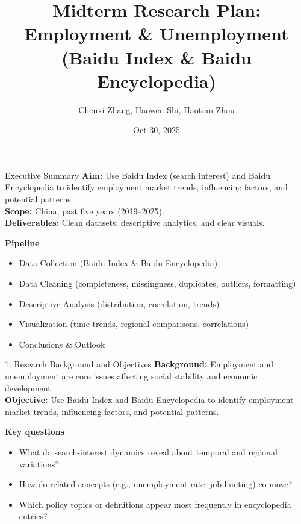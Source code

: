 \documentclass[aspectratio=169,11pt]{beamer}
\title[Employment \& Unemployment (Baidu Index \& Baike)]%
{Midterm Research Plan: Employment \& Unemployment (Baidu Index \& Baidu Encyclopedia)}
\author{Chenxi Zhang, Haowen Shi, Haotian Zhou} %
\institute{Course: Data Science and AI}
\date[Oct 30, 2025]{Oct 30, 2025}
\begin{document}
	
	\begin{frame}
		\titlepage
	\end{frame}
	
	\begin{frame}{Executive Summary}
		\small
		\textbf{Aim:} Use Baidu Index (search interest) and Baidu Encyclopedia to identify employment market trends, influencing factors, and potential patterns. \\
		\textbf{Scope:} China, past five years (2019--2025). \\
		\textbf{Deliverables:} Clean datasets, descriptive analytics, and clear visuals.
		\medskip
		
		\textbf{Pipeline}
		\begin{itemize}
			\item Data Collection (Baidu Index \& Baidu Encyclopedia)
			\item Data Cleaning (completeness, missingness, duplicates, outliers, formatting)
			\item Descriptive Analysis (distribution, correlation, trends)
			\item Visualization (time trends, regional comparisons, correlations)
			\item Conclusions \& Outlook
		\end{itemize}
	\end{frame}
	
	\begin{frame}{1. Research Background and Objectives}
		\small
		\textbf{Background:} Employment and unemployment are core issues affecting social stability and economic development. \\
		\textbf{Objective:} Use Baidu Index and Baidu Encyclopedia to identify employment-market trends, influencing factors, and potential patterns.
		\medskip
		
		\textbf{Key questions}
		\begin{itemize}
			\item What do search-interest dynamics reveal about temporal and regional variations?
			\item How do related concepts (e.g., unemployment rate, job hunting) co-move?
			\item Which policy topics or definitions appear most frequently in encyclopedia entries?
		\end{itemize}
	\end{frame}
	
\end{document}
